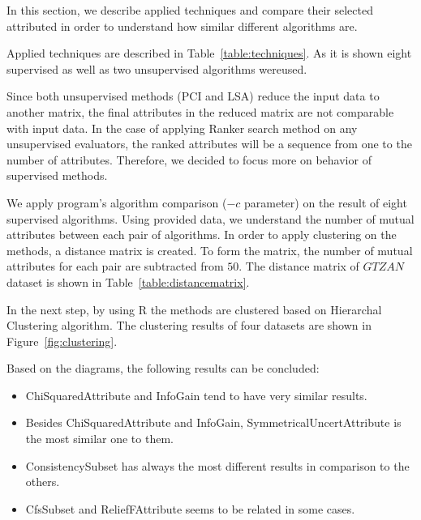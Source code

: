 In this section, we describe applied techniques and compare their selected attributed in order to understand how similar different algorithms are.

Applied techniques are described in Table~\ref{table:techniques}. As it is shown eight supervised as well as two unsupervised algorithms wereused.

Since both unsupervised methods (PCI and LSA) reduce the input data to another matrix, the final attributes in the reduced
matrix are not comparable with input data. In the case of applying Ranker search method on any unsupervised evaluators, the ranked attributes will be a sequence from one to the number of attributes. Therefore, we decided to focus more on behavior of supervised methods.

We apply program's algorithm comparison ($-c$ parameter) on the result of eight supervised algorithms. Using provided data, we understand the number of mutual attributes between each pair of algorithms. In order to apply clustering on the methods, a distance matrix is created. To form the matrix, the number of mutual attributes for each pair are subtracted from $50$. The distance matrix of $GTZAN$ dataset is shown in Table~\ref{table:distancematrix}.

In the next step, by using R the methods are clustered based on Hierarchal Clustering algorithm. The clustering results of four datasets are shown in Figure~\ref{fig:clustering}.

Based on the diagrams, the following results can be concluded:
\begin{itemize}
\item ChiSquaredAttribute and InfoGain tend to have very similar results.
\item Besides ChiSquaredAttribute and InfoGain, SymmetricalUncertAttribute is the most similar one to them.
\item ConsistencySubset has always the most different results in comparison to the others.
\item CfsSubset and ReliefFAttribute seems to be related in some cases.
\end{itemize}

